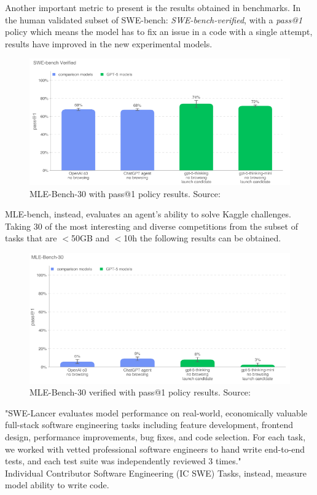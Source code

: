 \documentclass[12pt]{article}
\begin{document}
Another important metric to present is the results obtained in benchmarks. In the human validated subset of SWE-bench: \textit{SWE-bench-verified}, with a \textit{pass@1} policy which means the model has to fix an issue in a code with a single attempt, results have improved in the new experimental models.
    \begin{figure}[H]
    \centering
            \includegraphics[width=1\textwidth]{SWE-bench-verifiedChatGPT.png}
    \caption[GPT-5 MLE-Bench-30]{MLE-Bench-30 with pass@1 policy results. Source: \cite{OpenAIGPT-5SystemCard}}
    \end{figure}
MLE-bench, instead, evaluates an agent’s ability to solve Kaggle challenges. Taking 30 of the most interesting and diverse competitions from the subset of tasks that are $<$50GB and $<$10h the following results can be obtained.
    \begin{figure}[H]
    \centering
            \includegraphics[width=1\textwidth]{MLE-bench-30ChatGPT.png}
    \caption[GPT-5 MLE-Bench-30 verified]{MLE-Bench-30 verified with pass@1 policy results. Source: \cite{OpenAIGPT-5SystemCard}}
    \end{figure}
"SWE-Lancer evaluates model performance on real-world, economically valuable full-stack software engineering tasks including feature development, frontend design, performance improvements, bug fixes, and code selection. For each task, we worked with vetted professional software engineers to hand write end-to-end tests, and each test suite was independently reviewed 3 times."\cite{OpenAIGPT-5SystemCard}\\
Individual Contributor Software Engineering (IC SWE) Tasks, instead, measure model ability to write code.
\end{document}
